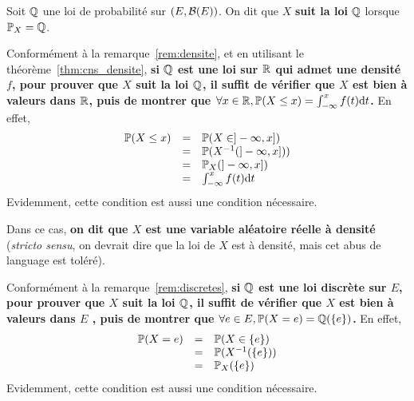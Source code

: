 \documentclass[../integ-proba.tex]{subfiles}
\begin{document}
    \begin{defi}
        Soit $\mathbb{Q}$ une loi de probabilité sur $\left(E, \mathcal{B}(E) \right)$.
        On dit que $X$ \textbf{suit la loi} $\mathbb{Q}$ lorsque $\mathbb{P}_X = \mathbb{Q}$.
    \end{defi}

    \begin{rem}
        Conformément à la remarque~\ref{rem:densite}, et en utilisant le théorème~\ref{thm:cns_densite}, \textbf{si $\mathbb{Q}$ est une loi sur $\mathbb{R}$ qui admet une densité $f$, pour prouver que $X$ suit la loi $\mathbb{Q}$, il suffit de vérifier que $X$ est bien à valeurs dans $\mathbb{R}$, puis de montrer que $\forall x \in \mathbb{R}, \mathbb{P}(X \leq x) = \int_{-\infty}^x f(t) \textnormal{d}t$.}
        En effet,
        \begin{displaymath}
            \begin{array}{rcl}
                \mathbb{P}(X \leq x) & = & \mathbb{P}(X \in ]-\infty, x]) \\
                           & = & \mathbb{P}(X^{-1}(]-\infty, x])) \\
                           & = & \mathbb{P}_X(]-\infty, x]) \\
                           & = & \int_{-\infty}^x f(t) \textnormal{d}t
            \end{array}
        \end{displaymath}
        Evidemment, cette condition est aussi une condition nécessaire.

        Dans ce cas, \textbf{on dit que $X$ est une variable aléatoire réelle à densité} (\textit{stricto sensu}, on devrait dire que la loi de $X$ est à densité, mais cet abus de language est toléré).
    \end{rem}

    \begin{rem}
        Conformément à la remarque~\ref{rem:discretes}, \textbf{si $\mathbb{Q}$ est une loi discrète sur $E$, pour prouver que $X$ suit la loi $\mathbb{Q}$, il suffit de vérifier que $X$ est bien à valeurs dans $E$ , puis de montrer que $\forall e \in E, \mathbb{P}(X = e) = \mathbb{Q}(\left\{ e \right\})$.}
        En effet,
        \begin{displaymath}
            \begin{array}{rcl}
                \mathbb{P}(X = e) & = & \mathbb{P}(X \in \left\{ e \right\}) \\
                           & = & \mathbb{P}(X^{-1}(\left\{ e \right\})) \\
                           & = & \mathbb{P}_X(\left\{ e \right\})
            \end{array}
        \end{displaymath}
        Evidemment, cette condition est aussi une condition nécessaire.
    \end{rem}
\end{document}
